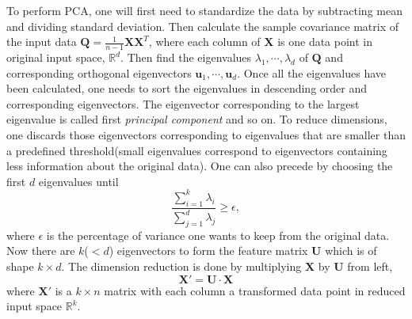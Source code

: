 \documentclass[11pt,a4paper]{article}
\theoremstyle{definition}
\numberwithin{equation}{section}
\let\vec\mathbf
\begin{document}
	To perform PCA, one will first need to standardize the data by subtracting mean and dividing standard deviation. Then calculate the sample covariance matrix of the input data $\vec Q = \frac{1}{n-1}\vec X\vec X^T$, where each column of $\vec X$ is one data point in original input space, $\mathbb R^d$. Then find the eigenvalues $\lambda_1, \cdots,\lambda_d$ of $\vec Q$ and corresponding orthogonal eigenvectors $\vec u_1,\cdots,\vec u_d$. Once all the eigenvalues have been calculated, one needs to sort the eigenvalues in descending order and corresponding eigenvectors. The eigenvector corresponding to the largest eigenvalue is called first \textit{principal component} and so on. To reduce dimensions, one discards those eigenvectors corresponding to eigenvalues that are smaller than a predefined threshold(small eigenvalues correspond to eigenvectors containing less information about the original data). One can also precede by choosing the first $d$ eigenvalues until
	\begin{equation}
	\frac{\sum_{i=1}^{k}\lambda_i}{\sum_{j=1}^{d}\lambda_j}\geq \epsilon, 
	\end{equation} 
	where $\epsilon$ is the percentage of variance one wants to keep from the original data. Now there are $k$($<d$) eigenvectors to form the feature matrix $\vec U$ which is of shape $k\times d$. The dimension reduction is done by multiplying $\vec X$ by $\vec U$ from left,
	\begin{equation}
	\vec X' = \vec U \cdot \vec X
	\end{equation}
	where $\vec X'$ is a $k\times n$ matrix with each column a transformed data point in reduced input space $\mathbb R^k$.
	
\end{document}
